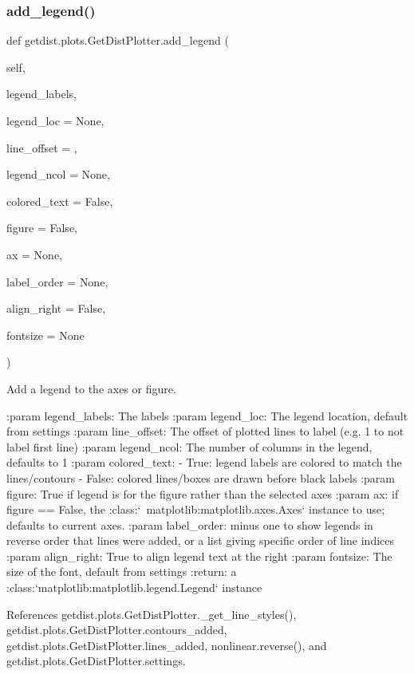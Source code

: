 \subsubsection{\texorpdfstring{add\+\_\+legend()}{add\_legend()}}
{\footnotesize\ttfamily def getdist.\+plots.\+Get\+Dist\+Plotter.\+add\+\_\+legend (\begin{DoxyParamCaption}\item[{}]{self,  }\item[{}]{legend\+\_\+labels,  }\item[{}]{legend\+\_\+loc = {\ttfamily None},  }\item[{}]{line\+\_\+offset = {},  }\item[{}]{legend\+\_\+ncol = {\ttfamily None},  }\item[{}]{colored\+\_\+text = {\ttfamily False},  }\item[{}]{figure = {\ttfamily False},  }\item[{}]{ax = {\ttfamily None},  }\item[{}]{label\+\_\+order = {\ttfamily None},  }\item[{}]{align\+\_\+right = {\ttfamily False},  }\item[{}]{fontsize = {\ttfamily None} }\end{DoxyParamCaption})}

\begin{DoxyVerb}Add a legend to the axes or figure.

:param legend_labels: The labels
:param legend_loc: The legend location, default from settings
:param line_offset: The offset of plotted lines to label (e.g. 1 to not label first line)
:param legend_ncol: The number of columns in the legend, defaults to 1 
:param colored_text: 
             - True: legend labels are colored to match the lines/contours
             - False: colored lines/boxes are drawn before black labels
:param figure: True if legend is for the figure rather than the selected axes 
:param ax: if figure == False, the :class:`~matplotlib:matplotlib.axes.Axes` instance to use; defaults to current axes. 
:param label_order: minus one to show legends in reverse order that lines were added, or a list giving specific order of line indices 
:param align_right: True to align legend text at the right
:param fontsize: The size of the font, default from settings
:return: a :class:`matplotlib:matplotlib.legend.Legend` instance
\end{DoxyVerb}
 

References getdist.\+plots.\+Get\+Dist\+Plotter.\+\_\+get\+\_\+line\+\_\+styles(), getdist.\+plots.\+Get\+Dist\+Plotter.\+contours\+\_\+added, getdist.\+plots.\+Get\+Dist\+Plotter.\+lines\+\_\+added, nonlinear.\+reverse(), and getdist.\+plots.\+Get\+Dist\+Plotter.\+settings.



